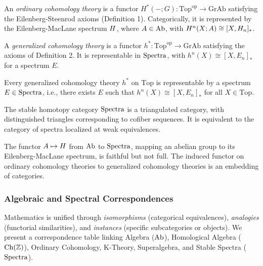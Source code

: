 \documentclass{article}
\begin{document}
\begin{definition}
An \emph{ordinary cohomology theory} is a functor \( H^*(-; G): \text{Top}^{\text{op}} \to \text{GrAb} \) satisfying the Eilenberg-Steenrod axioms (Definition 1). Categorically, it is represented by the Eilenberg-MacLane spectrum \( H \), where \( A \in \text{Ab} \), with \( H^n(X; A) \cong [X, H_n]_* \).
\end{definition}

\begin{definition}
A \emph{generalized cohomology theory} is a functor \( h^*: \text{Top}^{\text{op}} \to \text{GrAb} \) satisfying the axioms of Definition 2. It is representable in \( \text{Spectra} \), with \( h^n(X) \cong [X, E_n]_* \) for a spectrum \( E \).
\end{definition}

\begin{theorem}
Every generalized cohomology theory \( h^* \) on \( \text{Top} \) is representable by a spectrum \( E \in \text{Spectra} \), i.e., there exists \( E \) such that \( h^n(X) \cong [X, E_n]_* \) for all \( X \in \text{Top} \).
\end{theorem}

\begin{theorem}
The stable homotopy category \( \text{Spectra} \) is a triangulated category, with distinguished triangles corresponding to cofiber sequences. It is equivalent to the category of spectra localized at weak equivalences.
\end{theorem}

\begin{theorem}
The functor \( A \mapsto H \) from \( \text{Ab} \) to \( \text{Spectra} \), mapping an abelian group to its Eilenberg-MacLane spectrum, is faithful but not full. The induced functor on ordinary cohomology theories to generalized cohomology theories is an embedding of categories.
\end{theorem}

\subsubsection{Algebraic and Spectral Correspondences}

Mathematics is unified through \emph{isomorphisms} (categorical equivalences),
\emph{analogies} (functorial similarities), and \emph{instances} (specific subcategories or objects).
We present a correspondence table linking Algebra (\( \text{Ab} \)), Homological Algebra (\( \text{Ch}(\mathbb{Z}) \)),
Ordinary Cohomology, K-Theory, Superalgebra, and Stable Spectra (\( \text{Spectra} \)).
\end{document}
